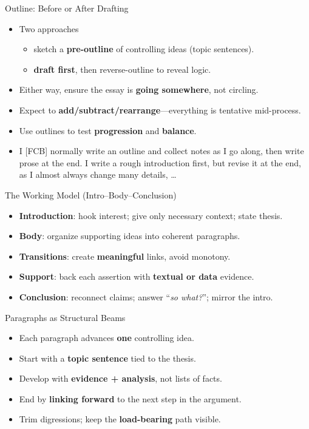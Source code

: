 \documentclass[aspectratio=169]{beamer}
\begin{document}
\begin{frame}{Outline: Before or After Drafting}
  \begin{itemize}
  \item Two approaches
    \begin{itemize}
    \item[A] sketch a \textbf{pre-outline} of controlling ideas (topic sentences).
    \item[B] \textbf{draft first}, then reverse-outline to reveal logic.
    \end{itemize}
  \item Either way, ensure the essay is \textbf{going somewhere}, not circling.
  \item Expect to \textbf{add/subtract/rearrange}—everything is tentative mid-process.
  \item Use outlines to test \textbf{progression} and \textbf{balance}.\\[2ex]
    
  \item I [FCB] normally write an outline and collect notes as I go along, then write prose at the end.  I write a rough introduction first, but revise it at the end, as I almost always change many details, \ldots
\end{itemize}
\end{frame}

\begin{frame}{The Working Model (Intro–Body–Conclusion)}
\begin{itemize}
  \item \textbf{Introduction}: hook interest; give only necessary context; state thesis.
  \item \textbf{Body}: organize supporting ideas into coherent paragraphs.
  \item \textbf{Transitions}: create \textbf{meaningful} links, avoid monotony.
  \item \textbf{Support}: back each assertion with \textbf{textual or data} evidence.
  \item \textbf{Conclusion}: reconnect claims; answer “\textit{so what?}”; mirror the intro.
\end{itemize}
\end{frame}

\begin{frame}{Paragraphs as Structural Beams}
\begin{itemize}
  \item Each paragraph advances \textbf{one} controlling idea.
  \item Start with a \textbf{topic sentence} tied to the thesis.
  \item Develop with \textbf{evidence + analysis}, not lists of facts.
  \item End by \textbf{linking forward} to the next step in the argument.
  \item Trim digressions; keep the \textbf{load-bearing} path visible.
\end{itemize}
\end{frame}
\end{document}
